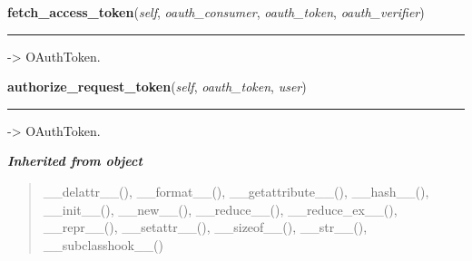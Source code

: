     \label{lib:oauth:OAuthDataStore:fetch_access_token}

    \vspace{0.5ex}

\hspace{.8\funcindent}\begin{boxedminipage}{\funcwidth}

    \raggedright \textbf{fetch\_access\_token}(\textit{self}, \textit{oauth\_consumer}, \textit{oauth\_token}, \textit{oauth\_verifier})

    \vspace{-1.5ex}

    \rule{\textwidth}{0.5\fboxrule}
\setlength{\parskip}{2ex}
    -{\textgreater} OAuthToken.

\setlength{\parskip}{1ex}
    \end{boxedminipage}

    \label{lib:oauth:OAuthDataStore:authorize_request_token}

    \vspace{0.5ex}

\hspace{.8\funcindent}\begin{boxedminipage}{\funcwidth}

    \raggedright \textbf{authorize\_request\_token}(\textit{self}, \textit{oauth\_token}, \textit{user})

    \vspace{-1.5ex}

    \rule{\textwidth}{0.5\fboxrule}
\setlength{\parskip}{2ex}
    -{\textgreater} OAuthToken.

\setlength{\parskip}{1ex}
    \end{boxedminipage}


\large{\textbf{\textit{Inherited from object}}}

\begin{quote}
\_\_delattr\_\_(), \_\_format\_\_(), \_\_getattribute\_\_(), \_\_hash\_\_(), \_\_init\_\_(), \_\_new\_\_(), \_\_reduce\_\_(), \_\_reduce\_ex\_\_(), \_\_repr\_\_(), \_\_setattr\_\_(), \_\_sizeof\_\_(), \_\_str\_\_(), \_\_subclasshook\_\_()
\end{quote}

